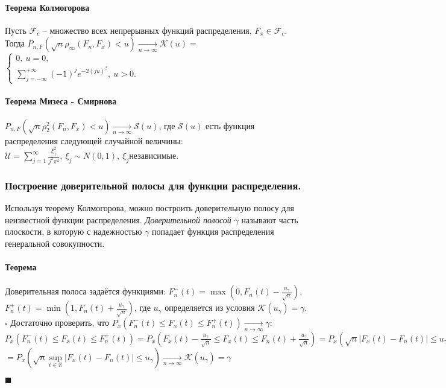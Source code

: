 \documentclass{article}
\begin{document}
    \paragraph{Теорема Колмогорова}
        Пусть $\mathcal{F}_c$ -- множество всех непрерывных функций распределения, $F_x \in \mathcal{F}_c$. Тогда
        \newline
        $P_{n, F}(\sqrt{n} \rho_{\infty} (F_n, F_x) < u) \xrightarrow[n \to \infty]{} \mathcal{K}(u) =$ $\begin{cases}
            0,~ u = 0,\\
            \sum\limits_{j = -\infty}^{+\infty} (-1)^j e^{-2 (ju)^2},~ u > 0.
        \end{cases}$
    \paragraph{Теорема Мизеса - Смирнова}
        $P_{n, F}(\sqrt{n} \rho^{2}_{2} (F_n, F_x) < u) \xrightarrow[n \to \infty]{} \mathcal{S}(u)$, где $\mathcal{S}(u)$ есть функция распределения следующей случайной величины: $\mathcal{U} = \sum\limits_{j = 1}^{\infty} \frac{\xi^2_j}{j^2 \pi^2},~ \xi_j \sim N(0, 1),~ \xi_j \text{независимые}.$
    \subsubsection{Построение доверительной полосы для функции распределения.}
        Используя теорему Колмогорова, можно построить доверительную полосу для неизвестной функции распределения.
        \newline
        \textit{Доверительной полосой} $\gamma$ называют часть плоскости, в которую с надежностью $\gamma$ попадает функция распределения генеральной совокупности.
    \paragraph{Теорема}
        Доверительная полоса задаётся функциями:
        $F^{-}_n(t) = \max\left(0, F_n(t) - \frac{u_{\gamma}}{\sqrt{n}}\right)$, $F^{+}_n(t) = \min\left(1, F_n(t) + \frac{u_{\gamma}}{\sqrt{n}}\right)$, где $u_{\gamma}$ определяется из условия $\mathcal{K}(u_{\gamma}) = \gamma$.
    \newline    
    $\square$    
    \newline 
    Достаточно проверить, что $P_x(F^{-}_n(t) \leqslant F_x(t) \leqslant F^{+}_n(t))
    \xrightarrow[n \to \infty]{} \gamma$:
    \newline
    $P_x(F^{-}_n(t) \leqslant F_x(t) \leqslant F^{+}_n(t)) = P_x\left(F_x(t) - \frac{u_{\gamma}}{\sqrt{n}} \leqslant F_x(t) \leqslant F_n(t) + \frac{u_{\gamma}}{\sqrt{n}}\right) = P_x\left(\sqrt{n} |F_x(t) - F_n(t)| \leqslant u_{\gamma}\right) =$ 
    \newline
    $= P_x\left(\sqrt{n} \sup\limits_{t \in \mathbb{R}} |F_x(t) - F_n(t)| \leqslant u_{\gamma}\right) \xrightarrow[n \to \infty]{} \mathcal{K}(u_{\gamma}) = \gamma$
    \newline
    \begin{flushright}
        $\blacksquare$
    \end{flushright}
\end{document}

